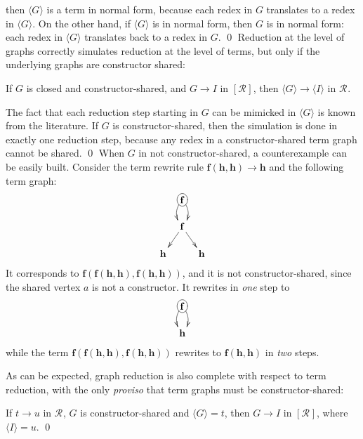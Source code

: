 \documentclass{LMCS}
\newcommand{\funone}{\mathbf{f}}
\newcommand{\funthree}{\mathbf{h}}
\newcommand{\termone}{t}
\newcommand{\termtwo}{u}
\newcommand{\tgone}{G}
\newcommand{\tgfive}{I}
\newcommand{\Rules}[1]{\mathcal{R}_{#1}}
\newcommand{\CtoCG}[1]{[#1]}
\newcommand{\CGtoC}[1]{\langle #1\rangle}
\newcommand{\srrone}{\Rules{}}
\newcommand{\rewrTRS}{\rightarrow}
\newcommand{\rewrgraph}{\rightarrow}
\begin{document}
then $\CGtoC{\tgone}$ is a term in normal form, because each
redex in $\tgone$ translates to a redex in $\CGtoC{\tgone}$.
On the other hand, if $\CGtoC{\tgone}$ is in normal form,
then $\tgone$ is in normal form: each redex in $\CGtoC{\tgone}$
translates back to a redex in $\tgone$.
\qed
Reduction at the level of graphs correctly simulates reduction
at the level of terms, but only if the underlying graphs
are constructor shared:
\begin{lem}\label{lemma:CGtoC}
If $\tgone$ is closed and constructor-shared, and 
$\tgone\rewrgraph\tgfive$ in  $\CtoCG{\srrone}$, then
$\CGtoC{\tgone}\rewrgraph\CGtoC{\tgfive}$ in $\srrone$.
\end{lem}
\proof
The fact that each reduction step starting in $\tgone$ can be
mimicked in $\CGtoC{\tgone}$ is known
from the literature. If $\tgone$ is constructor-shared,
then the simulation is done in exactly one reduction step,
because any redex in a constructor-shared
term graph cannot be shared.
\qed
When $\tgone$ in not constructor-shared, a counterexample
can be easily built. Consider the term rewrite rule
$\funone(\funthree,\funthree)\rewrTRS\funthree$ and the following term graph:
\begin{displaymath}
\xymatrix@R=15pt@C=8pt{
 & *+[o][F]{\funone}\ar@/_/[d]\ar@/^/[d] &  \\
 & \funone\ar[dl]\ar[dr] & \\
 \funthree & & \funthree\\
}
\end{displaymath}
It corresponds to $\funone(\funone(\funthree,\funthree),\funone(\funthree,\funthree))$, and it is not
constructor-shared, since the shared vertex $a$ is not a constructor. 
It rewrites in \emph{one} step to 
\begin{displaymath}
\xymatrix@R=15pt@C=8pt{
 & *+[o][F]{\funone}\ar@/_/[d]\ar@/^/[d] &  \\
 & \funthree & \\
}
\end{displaymath}
while the term $\funone(\funone(\funthree,\funthree),\funone(\funthree,\funthree))$ rewrites to $\funone(\funthree,\funthree)$ in
\emph{two} steps.

As can be expected, graph reduction is also complete with respect to
term reduction, with the only \emph{proviso} that term graphs must
be constructor-shared:
\begin{lem}\label{lemma:CtoCG}
If $\termone\rewrTRS\termtwo$ in $\srrone$, $\tgone$ is constructor-shared 
and $\CGtoC{\tgone}=\termone$, then
$\tgone\rewrgraph\tgfive$ in $\CtoCG{\srrone}$, where $\CGtoC{\tgfive}=\termtwo$. \qed
\end{lem}
\end{document}
